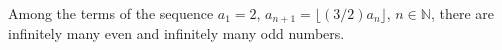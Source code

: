 Among the terms of the sequence $a_1 = 2$, $a_{n+1} = \lfloor (3/2)a_n \rfloor$, $n \in \mathbb{N}$, there are infinitely many even and infinitely many odd numbers.

